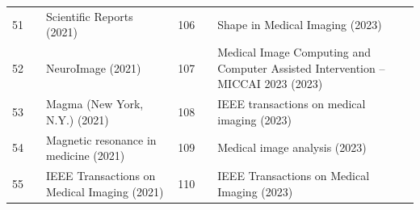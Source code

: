 \documentclass[11pt]{article}
\begin{document}
{\begin{longtable}{r l p{} r l p{}}
51 & \cite{kwan2021deep} & Scientific Reports (2021) & 106 & \cite{nivetha2023sadir} & Shape in Medical Imaging (2023) \\
52 & \cite{karimi2021deep} & NeuroImage (2021) & 107 & \cite{yilmaz2023selfsupervised} & Medical Image Computing and Computer Assisted Intervention – MICCAI 2023 (2023) \\
53 & \cite{dieckmeyer2021effect} & Magma (New York, N.Y.) (2021) & 108 & \cite{wang2023spatialintensity} & IEEE transactions on medical imaging (2023) \\
54 & \cite{hu2021runup} & Magnetic resonance in medicine (2021) & 109 & \cite{vakli2023automatic} & Medical image analysis (2023) \\
55 & \cite{muckley2021results} & IEEE Transactions on Medical Imaging (2021) & 110 & \cite{corderogrande2023fetal} & IEEE Transactions on Medical Imaging (2023) \\
\hline
\end{longtable}}
\end{document}
